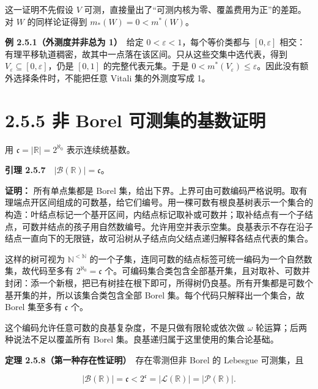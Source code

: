 \documentclass[11pt,a4paper]{article}
\begin{document}
这一证明不先假设 \(V\)
可测，直接量出了``可测内核为零、覆盖费用为正''的差距。对 \(W\)
的同样论证得到 \(m_*(W)=0<m^*(W)\)。

\textbf{例 2.5.1（外测度并非总为 1）}　给定
\(0<\varepsilon<1\)，每个等价类都与 \([0,\varepsilon]\)
相交：有理平移轨道稠密，故其中一点落在该区间。只从这些交集中选代表，得到
\(V_\varepsilon\subseteq[0,\varepsilon]\)，仍是 \([0,1]\)
的完整代表元集。于是
\(0<m^*(V_\varepsilon)\le\varepsilon\)。因此没有额外选择条件时，不能把任意
Vitali 集的外测度写成 1。

\section[\S{}2.5.5 非 Borel
可测集的基数证明]{2.5.5 非 Borel
可测集的基数证明}\label{ux975e-borel-ux53efux6d4bux96c6ux7684ux57faux6570ux8bc1ux660e}

用 \(\mathfrak c=|\mathbb R|=2^{\aleph_0}\) 表示连续统基数。

\textbf{引理 2.5.7}　\(|\mathcal B(\mathbb R)|=\mathfrak c\)。

\textbf{证明：} 所有单点集都是 Borel
集，给出下界。上界可由可数编码严格说明。取有理端点开区间组成的可数基，给它们编号。用一棵可数有根良基树表示一个集合的构造：叶结点标记一个基开区间，内结点标记取补或可数并；取补结点有一个子结点，可数并结点的孩子用自然数编号。允许用空并表示空集。良基表示不存在沿子结点一直向下的无限链，故可沿树从子结点向父结点递归解释各结点代表的集合。

这样的树可视为 \(\mathbb N^{<\mathbb N}\)
的一个子集，连同可数的结点标签可统一编码为一个自然数集，故代码至多有
\(2^{\aleph_0}=\mathfrak c\)
个。可编码集合类包含全部基开集，且对取补、可数并封闭：添一个新根，把已有树挂在根下即可，所得树仍良基。所有开集都是可数个基开集的并，所以该集合类包含全部
Borel 集。每个代码只解释出一个集合，故 Borel 集至多有 \(\mathfrak c\)
个。

这个编码允许任意可数的良基复杂度，不是只做有限轮或依次做 \(\omega\)
轮运算；后两种说法不足以覆盖所有 Borel
集。良基递归属于这里使用的集合论基础。

\textbf{定理 2.5.8（第一种存在性证明）}　存在零测但非 Borel 的 Lebesgue
可测集，且

\begin{equation*}
|\mathcal B(\mathbb R)|=\mathfrak c
<2^{\mathfrak c}=|\mathcal L(\mathbb R)|=|\mathcal P(\mathbb R)|.
\tag{2.5.9}
\end{equation*}
\end{document}

